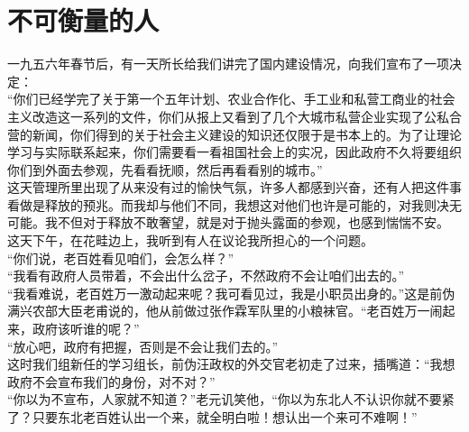 \fancyhead[RO]{} %
\fancyhead[LE]{} %
\chapter*{不可衡量的人}
\thispagestyle{empty}
一九五六年春节后，有一天所长给我们讲完了国内建设情况，向我们宣布了一项决定：\\

“你们已经学完了关于第一个五年计划、农业合作化、手工业和私营工商业的社会主义改造这一系列的文件，你们从报上又看到了几个大城市私营企业实现了公私合营的新闻，你们得到的关于社会主义建设的知识还仅限于是书本上的。为了让理论学习与实际联系起来，你们需要看一看祖国社会上的实况，因此政府不久将要组织你们到外面去参观，先看看抚顺，然后再看看别的城市。”\\

这天管理所里出现了从来没有过的愉快气氛，许多人都感到兴奋，还有人把这件事看做是释放的预兆。而我却与他们不同，我想这对他们也许是可能的，对我则决无可能。我不但对于释放不敢奢望，就是对于抛头露面的参观，也感到惴惴不安。\\

这天下午，在花畦边上，我听到有人在议论我所担心的一个问题。\\

“你们说，老百姓看见咱们，会怎么样？”\\

“我看有政府人员带着，不会出什么岔子，不然政府不会让咱们出去的。”\\

“我看难说，老百姓万一激动起来呢？我可看见过，我是小职员出身的。”这是前伪满兴农部大臣老甫说的，他从前做过张作霖军队里的小粮袜官。“老百姓万一闹起来，政府该听谁的呢？”\\

“放心吧，政府有把握，否则是不会让我们去的。”\\

这时我们组新任的学习组长，前伪汪政权的外交官老初走了过来，插嘴道：“我想政府不会宣布我们的身份，对不对？”\\

“你以为不宣布，人家就不知道？”老元讥笑他，“你以为东北人不认识你就不要紧了？只要东北老百姓认出一个来，就全明白啦！想认出一个来可不难啊！”\\

